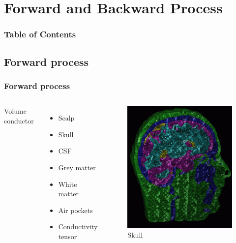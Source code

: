 \documentclass{beamer}
\begin{document}
\section{Forward and Backward Process}

\begin{frame}
    \frametitle{Table of Contents}
\end{frame}

\subsection{Forward process}
\begin{frame}
    \frametitle{Forward process}
    \begin{columns}
        Volume conductor
        \begin{itemize}
            \item Scalp
            \item Skull
            \item CSF
            \item Grey matter
            \item White matter
            \item Air pockets
            \item Conductivity tensor
        \end{itemize}

        \begin{figure}[H]
            \centering
            \includegraphics[height=0.5\textheight]{skull.png}
            \caption{Skull}
            \label{fig:Skull}
        \end{figure}

    \end{columns}
\end{frame}
\end{document}
